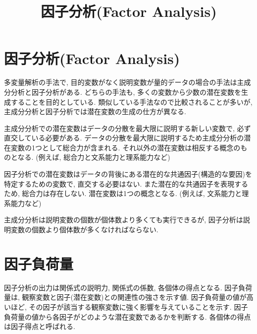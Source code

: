 \documentclass[dvipdfmx, 10pt]{jsarticle}
\title{\textbf{因子分析(Factor Analysis)}}
\author{}
\date{}
\begin{document}
\maketitle

\section*{因子分析(Factor Analysis)}
多変量解析の手法で, 目的変数がなく説明変数が量的データの場合の手法は主成分分析と因子分析がある. 
どちらの手法も, 多くの変数から少数の潜在変数を生成することを目的としている. 類似している手法なので比較されることが多いが, 
主成分分析と因子分析では潜在変数の生成の仕方が異なる. 

主成分分析での潜在変数はデータの分散を最大限に説明する新しい変数で, 
必ず直交している必要がある. データの分散を最大限に説明するため主成分分析の潜在変数の1つとして総合力が含まれる. 
それ以外の潜在変数は相反する概念のものとなる. (例えば, 総合力と文系能力と理系能力など)

因子分析での潜在変数はデータの背後にある潜在的な共通因子(構造的な要因)を特定するための変数で, 直交する必要はない. 
また潜在的な共通因子を表現するため, 総合力は存在しない. 潜在変数は1つの概念となる. (例えば, 文系能力と理系能力など)

主成分分析は説明変数の個数が個体数より多くても実行できるが, 因子分析は説明変数の個数より個体数が多くなければならない. 

\section*{因子負荷量}
因子分析の出力は関係式の説明力, 関係式の係数, 各個体の得点となる. 
因子負荷量は, 観察変数と因子(潜在変数)との関連性の強さを示す値. 
因子負荷量の値が高いほど, その因子が該当する観察変数に強く影響を与えていることを示す. 
因子負荷量の値から各因子がどのような潜在変数であるかを判断する. 各個体の得点は因子得点と呼ばれる. 
\end{document}
